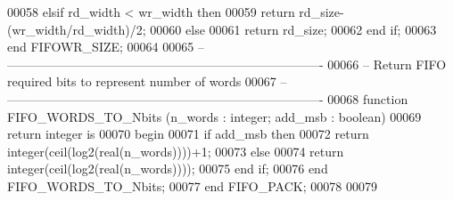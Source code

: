\begin{DoxyCode}
00058       \textcolor{keywordflow}{elsif} rd\_width < wr\_width \textcolor{keywordflow}{then} 
00059          \textcolor{keywordflow}{return} rd\_size-\textcolor{vhdlchar}{(}wr\_width/rd\_width\textcolor{vhdlchar}{)}/\textcolor{vhdllogic}{}\textcolor{vhdllogic}{2};
00060       \textcolor{keywordflow}{else} 
00061          \textcolor{keywordflow}{return} rd\_size;
00062       \textcolor{keywordflow}{end} \textcolor{keywordflow}{if};     
00063    \textcolor{keywordflow}{end} FIFOWR\_SIZE;
00064    
00065 \textcolor{keyword}{-- ----------------------------------------------------------------------------}
00066 \textcolor{keyword}{-- Return FIFO required bits to represent number of words}
00067 \textcolor{keyword}{-- ---------------------------------------------------------------------------- }
00068    \textcolor{keywordflow}{function} FIFO_WORDS_TO_Nbits (n\_words : \textcolor{comment}{integer}; add\_msb : \textcolor{comment}{boolean})  
00069       \textcolor{keywordflow}{return} \textcolor{comment}{integer} \textcolor{keywordflow}{is}     
00070    \textcolor{keywordflow}{begin} 
00071       \textcolor{keywordflow}{if} add\_msb \textcolor{keywordflow}{then} 
00072          \textcolor{keywordflow}{return} \textcolor{comment}{integer}\textcolor{vhdlchar}{(}ceil\textcolor{vhdlchar}{(}log2\textcolor{vhdlchar}{(}\textcolor{comment}{real}\textcolor{vhdlchar}{(}n\_words\textcolor{vhdlchar}{)}\textcolor{vhdlchar}{)}\textcolor{vhdlchar}{)}\textcolor{vhdlchar}{)}+\textcolor{vhdllogic}{}\textcolor{vhdllogic}{1};
00073       \textcolor{keywordflow}{else} 
00074          \textcolor{keywordflow}{return} \textcolor{comment}{integer}\textcolor{vhdlchar}{(}ceil\textcolor{vhdlchar}{(}log2\textcolor{vhdlchar}{(}\textcolor{comment}{real}\textcolor{vhdlchar}{(}n\_words\textcolor{vhdlchar}{)}\textcolor{vhdlchar}{)}\textcolor{vhdlchar}{)}\textcolor{vhdlchar}{)};
00075       \textcolor{keywordflow}{end} \textcolor{keywordflow}{if};
00076    \textcolor{keywordflow}{end} FIFO\_WORDS\_TO\_Nbits;
00077 \textcolor{keywordflow}{end} \textcolor{vhdlchar}{FIFO\_PACK};
00078       
00079       
\end{DoxyCode}
